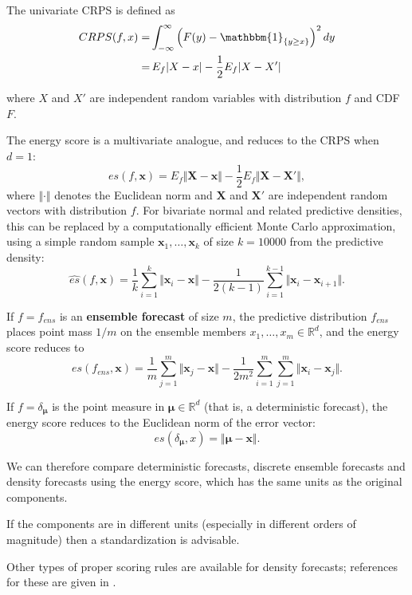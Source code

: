 \documentclass[10pt,fleqn]{article}
\begin{document}
The univariate CRPS is defined as
\begin{align*}
CRPS(f, x) =& \int_{-\infty}^\infty \left( F(y) - \mathbbm{1}_{\{y \ge x \}} \right)^2 dy \\
=& \, E_f \vert X-x \vert - \frac{1}{2} E_f \vert X-X' \vert
\end{align*}

where $X$ and $X'$ are independent random variables with distribution $f$ and CDF $F$. 

The energy score is a multivariate analogue, and reduces to the CRPS when $d=1$:
%
\[ es(f, \mathbf{x}) = E_f \Vert \mathbf{X}- \mathbf{x} \Vert - \frac{1}{2} E_f \Vert \mathbf{X} - \mathbf{X}' \Vert, \]
where $\Vert \cdot \Vert$ denotes the Euclidean norm and $\mathbf{X}$ and $\mathbf{X}'$ are independent random vectors with distribution $f$. For bivariate normal and related predictive densities, this can be replaced by a computationally efficient Monte Carlo approximation, using a simple random sample $\mathbf{x}_1, \dots, \mathbf{x}_k$ of size $k=10000$ from the predictive density:
%
\[\widehat{es}(f, \mathbf{x}) =  \frac{1}{k} \sum_{i=1}^k \Vert \mathbf{x}_i - \mathbf{x} \Vert - \frac{1}{2(k-1)}\sum_{i=1}^{k-1} \Vert \mathbf{x}_i - \mathbf{x}_{i+1} \Vert. \]

If $f = f_{ens}$ is an \textbf{ensemble forecast} of size $m$, the predictive distribution $f_{ens}$ places point mass $1/m$ on the ensemble members $x_1, \dots, x_m \in \mathbb{R}^d$, and the energy score reduces to
%
\[ es(f_{ens}, \mathbf{x}) = \frac{1}{m} \sum_{j=1}^m \Vert \mathbf{x}_j - \mathbf{x} \Vert - \frac{1}{2m^2} \sum_{i=1}^m \sum_{j=1}^m \Vert \mathbf{x}_i - \mathbf{x}_j \Vert. \]

If $f = \delta_{\boldsymbol{\mu}}$ is the point measure in $\boldsymbol{\mu} \in \mathbb{R}^d$ (that is, a deterministic forecast), the energy score reduces to the Euclidean norm of the error vector:
%
\[ es(\delta_{\boldsymbol{\mu}}, x) = \Vert \boldsymbol{\mu} - \mathbf{x} \Vert.\]

We can therefore compare deterministic forecasts, discrete ensemble forecasts and density forecasts using the energy score, which has the same units as the original components.

If the components are in different units (especially in different orders of magnitude) then a standardization is advisable.

Other types of proper scoring rules are available for density forecasts; references for these are given in \cite{Gneiting2008}.

\hrulefill
\printbibliography
\end{document}
